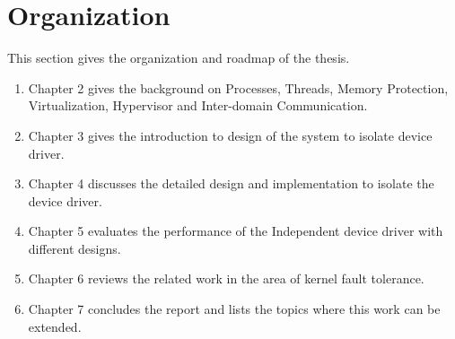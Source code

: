\section {Organization}
This section gives the organization and roadmap of the thesis.
\begin{enumerate}
\item Chapter 2 gives the background on Processes, Threads, Memory Protection, Virtualization, Hypervisor and Inter-domain Communication.
\item Chapter 3 gives the introduction to design of the system to isolate device driver. 
\item Chapter 4 discusses the detailed design and implementation to isolate the device driver. 
\item Chapter 5 evaluates the performance of the Independent device driver with different designs.
\item Chapter 6 reviews the related work in the area of kernel fault tolerance.
\item Chapter 7 concludes the report and lists the topics where this work can be extended.
\end{enumerate}
\pagebreak
{}